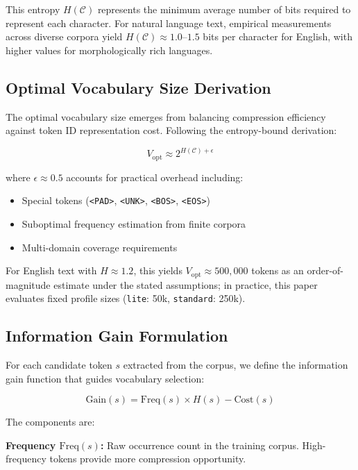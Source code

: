 \documentclass[11pt,a4paper,twocolumn]{article}
\begin{document}
This entropy $H(\mathcal{C})$ represents the minimum average number of bits required to represent each character. For natural language text, empirical measurements across diverse corpora yield $H(\mathcal{C}) \approx 1.0$--$1.5$ bits per character for English, with higher values for morphologically rich languages.

\subsection{Optimal Vocabulary Size Derivation}

The optimal vocabulary size emerges from balancing compression efficiency against token ID representation cost. Following the entropy-bound derivation:

\begin{equation}
V_{\text{opt}} \approx 2^{H(\mathcal{C}) + \epsilon}
\label{eq:optimal_vocab}
\end{equation}

where $\epsilon \approx 0.5$ accounts for practical overhead including:
\begin{itemize}
    \item Special tokens (\texttt{<PAD>}, \texttt{<UNK>}, \texttt{<BOS>}, \texttt{<EOS>})
    \item Suboptimal frequency estimation from finite corpora
    \item Multi-domain coverage requirements
\end{itemize}

For English text with $H \approx 1.2$, this yields $V_{\text{opt}} \approx 500{,}000$ tokens as an order-of-magnitude estimate under the stated assumptions; in practice, this paper evaluates fixed profile sizes (\texttt{lite}: 50k, \texttt{standard}: 250k).

\subsection{Information Gain Formulation}

For each candidate token $s$ extracted from the corpus, we define the information gain function that guides vocabulary selection:

\begin{equation}
\text{Gain}(s) = \text{Freq}(s) \times H(s) - \text{Cost}(s)
\label{eq:info_gain}
\end{equation}

The components are:

\textbf{Frequency $\text{Freq}(s)$:} Raw occurrence count in the training corpus. High-frequency tokens provide more compression opportunity.
\end{document}
